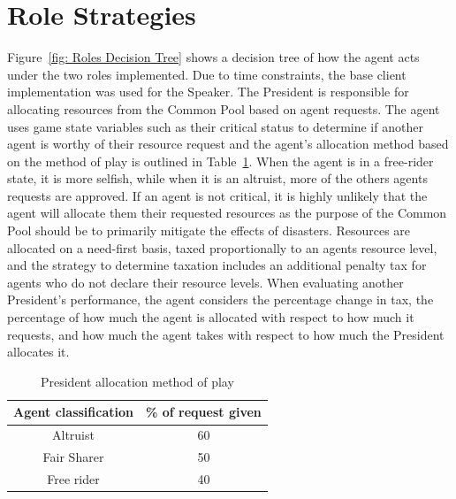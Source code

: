 \section{Role Strategies}

Figure~\ref{fig: Roles Decision Tree} shows a decision tree of how the agent acts under the two roles implemented. Due to time constraints, the base client implementation was used for the Speaker. The President is responsible for allocating resources from the Common Pool based on agent requests. The agent uses game state variables such as their critical status to determine if another agent is worthy of their resource request and the agent's allocation method based on the method of play is outlined in Table~\ref{tab:President allocation method of play}. When the agent is in a free-rider state, it is more selfish, while when it is an altruist, more of the others agents requests are approved. If an agent is not critical, it is highly unlikely that the agent will allocate them their requested resources as the purpose of the Common Pool should be to primarily mitigate the effects of disasters. Resources are allocated on a need-first basis, taxed proportionally to an agents resource level, and the strategy to determine taxation includes an additional penalty tax for agents who do not declare their resource levels. When evaluating another President's performance, the agent considers the percentage change in tax, the percentage of how much the agent is allocated with respect to how much it requests, and how much the agent takes with respect to how much the President allocates it.

\begin{table}[!htb]
\centering
\caption{President allocation method of play}
\label{tab:President allocation method of play}
\begin{tabular}{|c|c|}
\hline
\textbf{Agent classification} & \textbf{\% of request given} \\ \hline
Altruist                      & 60                           \\ \hline
Fair Sharer                   & 50                           \\ \hline
Free rider                    & 40                           \\ \hline
\end{tabular}
\end{table}

